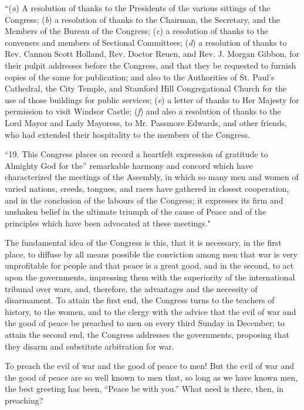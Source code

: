 \documentclass{book}
\begin{document}
“(\emph{a}) A resolution of thanks to the Presidents of the various sittings of the Congress; (\emph{b}) a resolution of thanks to the Chairman, the Secretary, and the Members of the Bureau of the Congress; (\emph{c}) a resolution of thanks to the conveners and members of Sectional Committees; (\emph{d}) a resolution of thanks to Rev. Cannon Scott Holland, Rev. Doctor Reuen, and Rev. J. Morgan Gibbon, for their pulpit addresses before the Congress, and that they be requested to furnish copies of the same for publication; and also to the Authorities of St. Paul’s Cathedral, the City Temple, and Stamford Hill Congregational Church for the use of those buildings for public services; (\emph{e}) a letter of thanks to Her Majesty for permission to visit Windsor Castle; (\emph{f}) and also a resolution of thanks to the Lord Mayor and Lady Mayoress, to Mr. Passmore Edwards, and other friends, who had extended their hospitality to the members of the Congress.

“19. This Congress places on record a heartfelt expression of gratitude to Almighty God for the” remarkable harmony and concord which have characterized the meetings of the Assembly, in which so many men and women of varied nations, creeds, tongues, and races have gathered in closest cooperation, and in the conclusion of the labours of the Congress; it expresses its firm and unshaken belief in the ultimate triumph of the cause of Peace and of the principles which have been advocated at these meetings."

The fundamental idea of the Congress is this, that it is necessary, in the first place, to diffuse by all means possible the conviction among men that war is very unprofitable for people and that peace is a great good, and in the second, to act upon the governments, impressing them with the superiority of the international tribunal over wars, and, therefore, the advantages and the necessity of disarmament. To attain the first end, the Congress turns to the teachers of history, to the women, and to the clergy with the advice that the evil of war and the good of peace be preached to men on every third Sunday in December; to attain the second end, the Congress addresses the governments, proposing that they disarm and substitute arbitration for war.

To preach the evil of war and the good of peace to men! But the evil of war and the good of peace are so well known to men that, so long as we have known men, the best greeting has been, “Peace be with you.” What need is there, then, in preaching?
\end{document}
